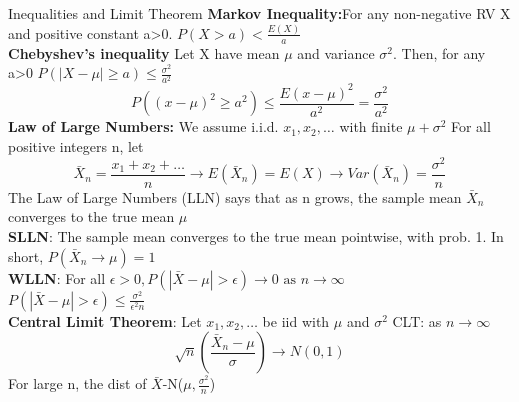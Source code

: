 \documentclass[a4paper, 12pt]{article}
\begin{document}
\begin{section}{Inequalities and Limit Theorem}
\textbf{Markov Inequality:}For any non-negative RV X and positive constant a>0. $P(X>a)<\frac{E(X)}{a}$\\
\textbf{Chebyshev's inequality} Let X have mean $\mu$ and variance $\sigma^{2}$. Then, for any a>0 $P(|X-\mu|\geq a)\leq\frac{\sigma^{2}}{a^{2}}$
\begin{equation} 
P((x-\mu)^{2}\geq a^{2})\leq\frac{E(x-\mu)^{2}}{a^{2}}=\frac{\sigma^{2}}{a^{2}}
\end{equation}
\textbf{Law of Large Numbers:} We assume i.i.d. $x_1,x_2,\dots$ with finite $\mu+\sigma^{2}$ For all positive integers n, let
\begin{equation} 
\bar{X}_{n}=\frac{x_1+x_2+\dots}{n} \to E(\bar{X}_{n})=E(X)\to Var(\bar{X}_{n})=\frac{\sigma^{2}}{n}
\end{equation}
The Law of Large Numbers (LLN) says that as n grows, the sample mean $\bar{X}_{n}$ converges to the true mean $\mu$\\
\textbf{SLLN}: The sample mean converges to the true mean pointwise, with prob. 1. In short, $P(\bar{X}_{n}\to\mu)=1$\\
\textbf{WLLN}: For all $\epsilon>0, P(|\bar{X}-\mu|>\epsilon)\to 0 \mbox{ as } n\to\infty$\\
$P(|\bar{X}-\mu|>\epsilon)\leq\frac{\sigma^{2}}{\epsilon^{2}n}$\\
\textbf{Central Limit Theorem}: Let $x_1,x_2,\dots$ be iid with $\mu$ and $\sigma^{2}$ CLT: as $n\to\infty$ 
\begin{equation} 
	\sqrt{n}(\frac{\bar{X}_{n}-\mu}{\sigma})\to N(0,1)
\end{equation}
For large n, the dist of $\bar{X}$-N($\mu,\frac{\sigma^{2}}{n}$)
\end{section}
\end{document}
